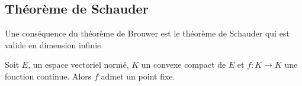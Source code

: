 \subsection{Théorème de Schauder}

Une conséquence du théorème de Brouwer est le théorème de Schauder qui est valide en dimension infinie.

\begin{theorem}       \label{ThovHJXIU}
	Soit \( E\), un espace vectoriel normé, \( K\) un convexe compact de \( E\) et \( f\colon K\to K\) une fonction continue. Alors \( f\) admet un point fixe.
\end{theorem}

